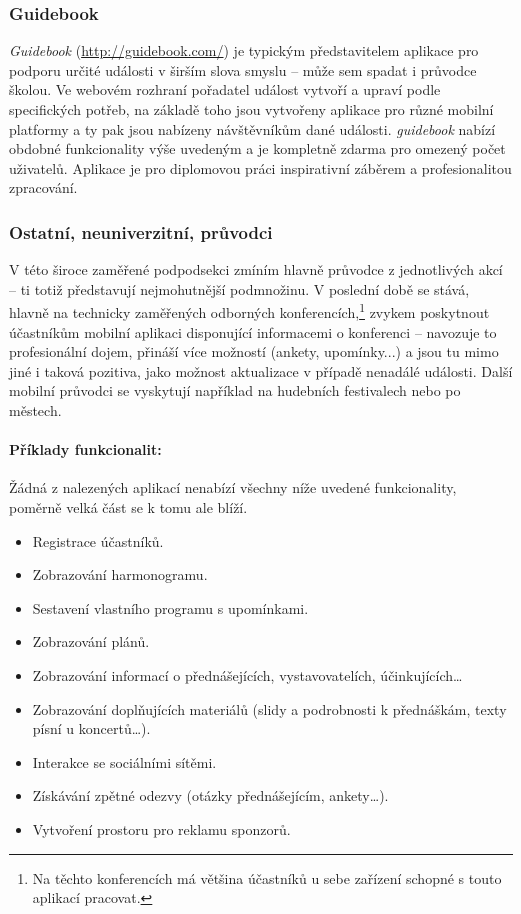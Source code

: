 \subsubsection{Guidebook}
\emph{Guidebook} (\url{http://guidebook.com/}) je typickým představitelem aplikace pro podporu určité události v širším slova smyslu -- může sem spadat i průvodce školou. Ve webovém rozhraní pořadatel událost vytvoří a upraví podle specifických potřeb, na základě toho jsou vytvořeny aplikace pro různé mobilní platformy a ty pak jsou nabízeny návštěvníkům dané události. \textit{guidebook} nabízí obdobné funkcionality výše uvedeným a je kompletně zdarma pro omezený počet uživatelů. Aplikace je pro diplomovou práci inspirativní záběrem a profesionalitou zpracování.

\subsubsection{Ostatní, neuniverzitní, průvodci}
V této široce zaměřené podpodsekci zmíním hlavně průvodce z jednotlivých akcí -- ti totiž představují nejmohutnější podmnožinu. V poslední době se stává, hlavně na technicky zaměřených odborných konferencích,\footnote{Na těchto konferencích má většina účastníků u sebe zařízení schopné s touto aplikací pracovat.} zvykem poskytnout účastníkům mobilní aplikaci disponující informacemi o konferenci -- navozuje to profesionální dojem, přináší více možností (ankety, upomínky...) a jsou tu mimo jiné i taková pozitiva, jako možnost aktualizace v případě nenadálé události. Další mobilní průvodci se vyskytují například na hudebních festivalech nebo po městech.

\paragraph{Příklady funkcionalit:}
Žádná z nalezených aplikací nenabízí všechny níže uvedené funkcionality, poměrně velká část se k tomu ale blíží.
\begin{itemize}
\item Registrace účastníků.
\item Zobrazování harmonogramu.
\item Sestavení vlastního programu s upomínkami.
\item Zobrazování plánů.
\item Zobrazování informací o přednášejících, vystavovatelích, účinkujících\dots
\item Zobrazování doplňujících materiálů (slidy a podrobnosti k přednáškám, texty písní u koncertů\dots).
\item Interakce se sociálními sítěmi.
\item Získávání zpětné odezvy (otázky přednášejícím, ankety\dots).
\item Vytvoření prostoru pro reklamu sponzorů. 
\end{itemize}

